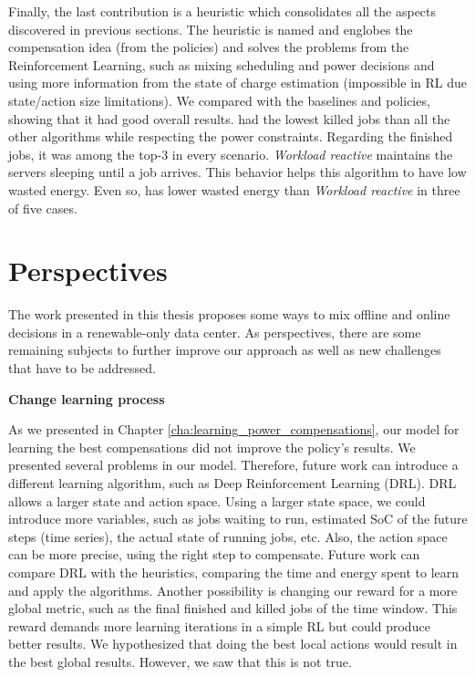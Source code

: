 Finally, the last contribution is a heuristic which consolidates all the aspects discovered in previous sections. The heuristic is named \emph{\systemName} and englobes the compensation idea (from the policies) and solves the problems from the Reinforcement Learning, such as mixing scheduling and power decisions and using more information from the state of charge estimation (impossible in RL due state/action size limitations). We compared \emph{\systemName} with the baselines and policies, showing that it had good overall results. \emph{\systemName} had the lowest killed jobs than all the other algorithms while respecting the power constraints. Regarding the finished jobs, it was among the top-3 in every scenario. \emph{Workload reactive} maintains the servers sleeping until a job arrives. This behavior helps this algorithm to have low wasted energy. Even so, \emph{\systemName} has lower wasted energy than \emph{Workload reactive} in three of five cases. 

\section{Perspectives}

The work presented in this thesis proposes some ways to mix offline and online decisions in a renewable-only data center. As perspectives, there are some remaining subjects to further improve our approach as well as new challenges that have to be addressed.

\textbf{Change learning process}

As we presented in Chapter \ref{cha:learning_power_compensations}, our model for learning the best compensations did not improve the policy's results. We presented several problems in our model. Therefore, future work can introduce a different learning algorithm, such as Deep Reinforcement Learning (DRL). DRL allows a larger state and action space. Using a larger state space, we could introduce more variables, such as jobs waiting to run, estimated SoC of the future steps (time series), the actual state of running jobs, etc. Also, the action space can be more precise, using the right step to compensate. Future work can compare DRL with the heuristics, comparing the time and energy spent to learn and apply the algorithms. Another possibility is changing our reward for a more global metric, such as the final finished and killed jobs of the time window. This reward demands more learning iterations in a simple RL but could produce better results. We hypothesized that doing the best local actions would result in the best global results. However, we saw that this is not true. 

